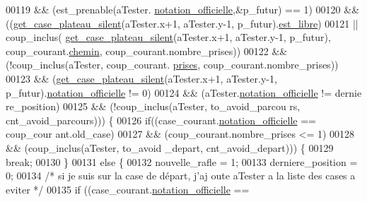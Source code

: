 \begin{DoxyCode}
00119                                         && (est\_prenable(aTester.
      \hyperlink{structcase__plateau_ad510581b324604a9cf685cbb769a421a}{notation_officielle},&p\_futur) == 1)
00120                                         && ((\hyperlink{plateau_8h_a60a8f706865d0ae9087f8d65d4667655}{get_case_plateau_silent}(aTester.x+1,
       aTester.y-1, p\_futur).\hyperlink{structcase__plateau_a173f25d2fd7c653d77ca8174ba4f636d}{est_libre})
00121                                                         || coup\_inclus(
      \hyperlink{plateau_8h_a60a8f706865d0ae9087f8d65d4667655}{get_case_plateau_silent}(aTester.x+1, aTester.y-1, p\_futur), coup\_courant.\hyperlink{structcoup_aa66b88eb8140c2f459ac92fad0796510}{chemin}, 
      coup\_courant.nombre\_prises))
00122                                         && (!coup\_inclus(aTester, coup\_courant.
      \hyperlink{structcoup_ae19b3a66d3f4e66b8f69a38e4005f44a}{prises}, coup\_courant.nombre\_prises))
00123                                         && (\hyperlink{plateau_8h_a60a8f706865d0ae9087f8d65d4667655}{get_case_plateau_silent}(aTester.x+1, 
      aTester.y-1, p\_futur).\hyperlink{structcase__plateau_ad510581b324604a9cf685cbb769a421a}{notation_officielle} != 0)
00124                                         && (aTester.\hyperlink{structcase__plateau_ad510581b324604a9cf685cbb769a421a}{notation_officielle} != dernie
      re\_position)
00125                                         && (!coup\_inclus(aTester, to\_avoid\_parcou
      rs, cnt\_avoid\_parcours))) \{
00126                                 \textcolor{keywordflow}{if}((case\_courant.\hyperlink{structcase__plateau_ad510581b324604a9cf685cbb769a421a}{notation_officielle} == coup\_cour
      ant.old\_case)
00127                                                 && (coup\_courant.nombre\_prises <=
       1)
00128                                                 && (coup\_inclus(aTester, to\_avoid
      \_depart, cnt\_avoid\_depart))) \{
00129                                         \textcolor{keywordflow}{break};
00130                                 \}
00131                                 \textcolor{keywordflow}{else} \{
00132                                         nouvelle\_rafle = 1;
00133                                         derniere\_position = 0;
00134                                         \textcolor{comment}{/* si je suis sur la case de départ, j'aj
      oute aTester a la liste des cases a eviter */}
00135                                         \textcolor{keywordflow}{if} ((case\_courant.\hyperlink{structcase__plateau_ad510581b324604a9cf685cbb769a421a}{notation_officielle} == 

\end{DoxyCode}
